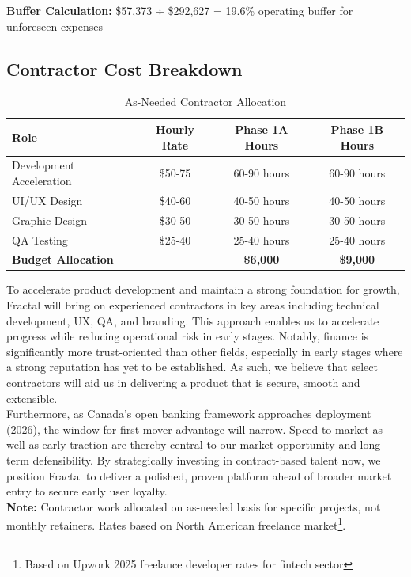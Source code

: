 \documentclass[11pt,letterpaper]{article}
\begin{document}
\textbf{Buffer Calculation:} \$57,373 ÷ \$292,627 = 19.6\% operating buffer for unforeseen expenses

\subsection{Contractor Cost Breakdown}

\begin{table}[h]
\centering
\caption{As-Needed Contractor Allocation}
\begin{tabular}{|l|c|c|c|}
\hline
\textbf{Role} & \textbf{Hourly Rate} & \textbf{Phase 1A Hours} & \textbf{Phase 1B Hours} \\
\hline
Development Acceleration & \$50-75 & 60-90 hours & 60-90 hours \\
UI/UX Design & \$40-60 & 40-50 hours & 40-50 hours \\
Graphic Design & \$30-50 & 30-50 hours & 30-50 hours \\
QA Testing & \$25-40 & 25-40 hours & 25-40 hours \\
\hline
\textbf{Budget Allocation} & & \textbf{\$6,000} & \textbf{\$9,000} \\
\hline
\end{tabular}
\end{table}

To accelerate product development and maintain a strong foundation for growth, Fractal will bring on experienced contractors in key areas including technical development, UX, QA, and branding. This approach enables us to accelerate progress while reducing operational risk in early stages. Notably, finance is significantly more trust-oriented than other fields, especially in early stages where a strong reputation has yet to be established. As such, we believe that select contractors will aid us in delivering a product that is secure, smooth and extensible.\\

Furthermore, as Canada's open banking framework approaches deployment (2026), the window for first-mover advantage will narrow. Speed to market as well as early traction are thereby central to our market opportunity and long-term defensibility. By strategically investing in contract-based talent now, we position Fractal to deliver a polished, proven platform ahead of broader market entry to secure early user loyalty.\\

\textbf{Note:} Contractor work allocated on as-needed basis for specific projects, not monthly retainers. Rates based on North American freelance market\footnote{Based on Upwork 2025 freelance developer rates for fintech sector}.
\end{document}
